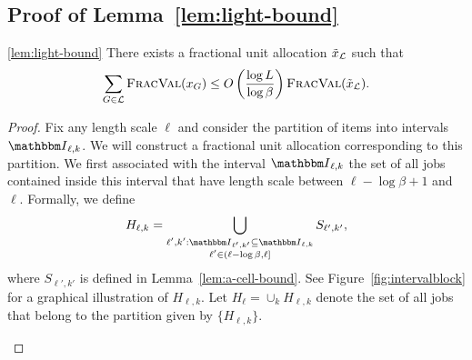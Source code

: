 \subsection{Proof of Lemma~\ref{lem:light-bound}}

\begin{numberedlemma}{\ref{lem:light-bound}}
    There exists a fractional unit allocation $\tilde{x}_{\mathcal{L}}$ such that 
    \[
        \sum_{G\in{\mathcal{L}}} {\normalfont\textsc{FracVal}}(x_G) \le
        O\left(\frac{\log L}{\log\beta}\right){\normalfont\textsc{FracVal}}(\tilde{x}_{\mathcal{L}}).
    \]
\end{numberedlemma}

\begin{proof}
  Fix any length scale $\ell$ and consider the partition of items into
  intervals $\Int_{\ell,k}$. We will construct a fractional unit
  allocation corresponding to this partition. We first associated with
  the interval $\Int_{\ell,k}$ the set of all jobs contained inside
  this interval that have length scale between $\ell-\log\beta+1$ and
  $\ell$. Formally, we define
    \begin{equation*}
        H_{\ell,k}=\Union_{\substack{ \ell',k':
            \Int_{\ell',k'}\subseteq \Int_{\ell,k} \\ \ell'\in
            (\ell-\log\beta, \ell]}} S_{\ell',k'},
    \end{equation*}
   where $S_{\ell',k'}$ is defined in
   Lemma~\ref{lem:a-cell-bound}. See Figure~\ref{fig:intervalblock} for 
   a graphical illustration of $H_{\ell,k}$.
   Let $H_\ell = \cup_k H_{\ell,k}$
   denote the set of all jobs that belong to the partition given by
   $\{H_{\ell,k}\}$. 

   \begin{figure}
       \centering
    \newcommand{\cellwidth}{0.5 cm}
    \newcommand{\cellheight}{0.8 cm}

\end{figure}
\end{proof}
